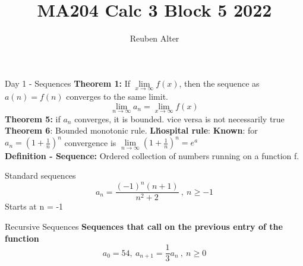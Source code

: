 \documentclass[a4paper, 12pt]{article}
\title{MA204 Calc 3 Block 5 2022}
\author{Reuben Alter}
\date{}
\begin{document}
\maketitle
\newpage
\tableofcontents

\newpage

\begin{section}{Day 1 - Sequences}
\textbf{Theorem 1:} If $\lim\limits_{x\to\infty}f(x)$, then the sequence as $a(n)=f(n)$ converges to the same
limit. 
\begin{equation}
	\lim\limits_{n\to\infty}a_{n}=\lim\limits_{x\to\infty}f(x)
\end{equation}
\textbf{Theorem 5:} if $a_{n}$ converges, it is bounded. vice versa is not necessarily
true
\textbf{Theorem 6}: Bounded monotonic rule. %
\textbf{L\'hospital rule}: %
\textbf{Known}: for $a_{n}=(1+\frac{1}{n})^{n}$ convergence is $\lim\limits_{n\to\infty}(1+\frac{1}{n})^{n}=e^{a}$\\

	\textbf{Definition - Sequence:} Ordered collection of numbers running on a function f. \\
	\begin{subsection}{Standard sequences}
	\begin{equation} \label{Example Sequence}
		a_{n}=\frac{(-1)^{n}(n+1)}{n^{2}+2} ~,~ n \geq -1
	\end{equation}
	Starts at n = -1
	
	\end{subsection}
	\begin{subsection}{Recursive Sequences}
	\textbf{Sequences that call on the previous entry of the function}
	\begin{equation} \label{Example Recursive Sequence}
		a_{0}=54,~a_{n+1}=\frac{1}{3}a_{n}~,~n\geq 0
	\end{equation}
	

\end{subsection}
\end{section}
\end{document}
